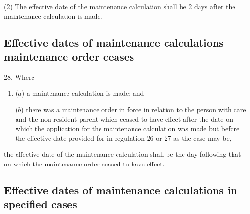 \documentclass[12pt,a4paper]{article}
\begin{document}
(2) The effective date of the maintenance calculation shall be 2 days after the maintenance calculation is made.


\subsection[28. Effective dates of maintenance calculations—maintenance order ceases]{Effective dates of maintenance calculations—maintenance order ceases}

28.  Where—
\begin{enumerate}\item[]
($a$) a maintenance calculation is made; and

($b$) there was a maintenance order in force in relation to the person with care and the non-resident parent which ceased to have effect after the date on which the application for the maintenance calculation was made but before the effective date provided for in regulation 
26 or 27  %
as the case may be,
\end{enumerate}
the effective date of the maintenance calculation shall be the day following that on which the maintenance order ceased to have effect.


\subsection[29. Effective dates of maintenance calculations in specified cases]{\sloppy Effective dates of maintenance calculations in specified cases}
\end{document}
